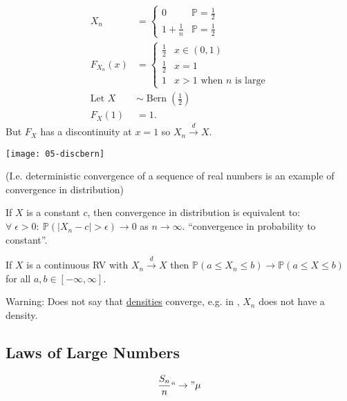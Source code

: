 \begin{example} ~\vspace*{-1.5\baselineskip}
    \begin{align*}
        X_n &= \begin{cases}
            0 & \mathbb{P} = \frac{1}{2} \\
            1 + \frac{1}{n} & \mathbb{P} = \frac{1}{2}
        \end{cases} \\
        F_{X_n}(x) &= \begin{cases}
            \frac{1}{2} & x \in (0, 1) \\
            \frac{1}{2} & x = 1 \\
            1 & x > 1 \text{ when $n$ is large}
        \end{cases} \\
        \text{Let } X &\sim \operatorname{Bern}\left( \frac{1}{2} \right) \\
        F_X(1) &= 1.
    \end{align*} 
    But $F_X$ has a discontinuity at $x = 1$ so $X_n \overset{d}{\to} X$.
    {\par \centering \texttt{[image: 05-discbern]} \par}
    (I.e. deterministic convergence of a sequence of real numbers is an example of convergence in distribution)
\end{example} 

\begin{claim}
    If $X$ is a constant $c$, then convergence in distribution is equivalent to: $\forall \; \epsilon > 0: \ \mathbb{P}(|X_n - c| > \epsilon) \to 0$ as $n \to \infty$. \color{blue} ``convergence in probability to constant''.
\end{claim} 

\begin{claim}
    If $X$ is a continuous RV with $X_n \overset{d}{\to} X$ then $\mathbb{P}(a \leq X_n \leq b) \to \mathbb{P}(a \leq X \leq b)$ for all $a, b \in [-\infty, \infty]$.
\end{claim} 

Warning: Does not say that \underline{densities} converge, e.g. in , $X_n$ does not have a density.

\subsection{Laws of Large Numbers}

\begin{align*}
    \frac{S_n}{n} ``\to" \mu
\end{align*} 

